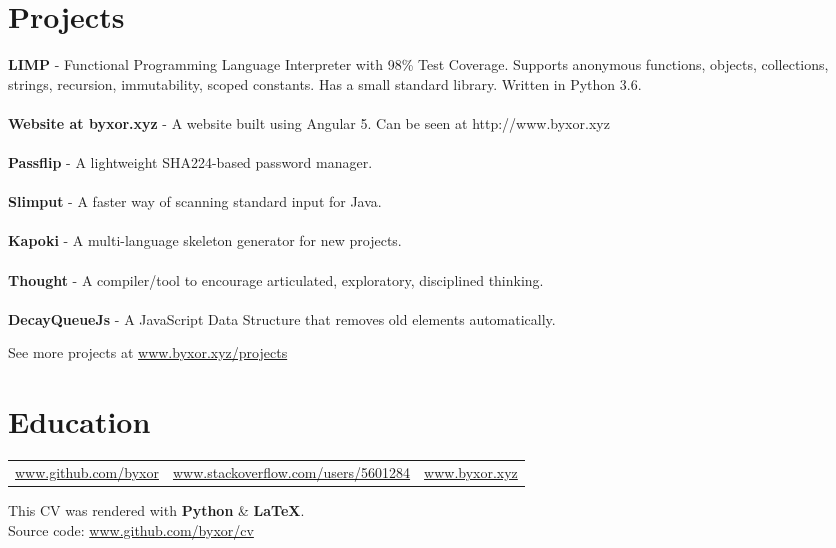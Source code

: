 \documentclass{article}
\newcommand{\yourlight}[1]{\textcolor{gray}{#1}}
\newcommand{\yoursocial}[2]{{\Large #1}\hspace{0.5em}\yourlight{\url{#2}}}\newcommand{\yourjustify}[1]{\makebox[	extwidth][s]{#1}}
\newcommand{\yourfooter}[1]{
  \vspace*{\fill}
  \begin{center}
    #1
  \end{center}
}
\begin{document}
\section{Projects}
\begin{multicols}{2}
{\textbf{LIMP} - Functional Programming Language Interpreter with 98\% Test Coverage. Supports anonymous functions, objects, collections, strings, recursion, immutability, scoped constants. Has a small standard library. Written in Python 3.6.}\\\\{\textbf{Website at byxor.xyz} - A website built using Angular 5. Can be seen at http://www.byxor.xyz}\\\\{\textbf{Passflip} - A lightweight SHA224-based password manager.}\\\\{\textbf{Slimput} - A faster way of scanning standard input for Java.}\\\\{\textbf{Kapoki} - A multi-language skeleton generator for new projects.}\\\\{\textbf{Thought} - A compiler/tool to encourage articulated, exploratory, disciplined thinking.}\\\\{\textbf{DecayQueueJs} - A JavaScript Data Structure that removes old elements automatically.}\\
\end{multicols}
\begin{center}
 See more projects at \url{www.byxor.xyz/projects}
\end{center}
\section{Education}
\yourfooter{
\begin{tabularx}{\textwidth}{*3{>{\Centering}X}}
\yoursocial{\faGithub}{www.github.com/byxor} & \yoursocial{\faStackOverflow}{www.stackoverflow.com/users/5601284} & \yoursocial{\faLaptop}{www.byxor.xyz}\\
\end{tabularx}
  
  \vspace{1em}
  
  This CV was rendered with \textbf{Python} {\&} \textbf{{\LaTeX}}.\\
  Source code: \url{www.github.com/byxor/cv}
}
\end{document}
